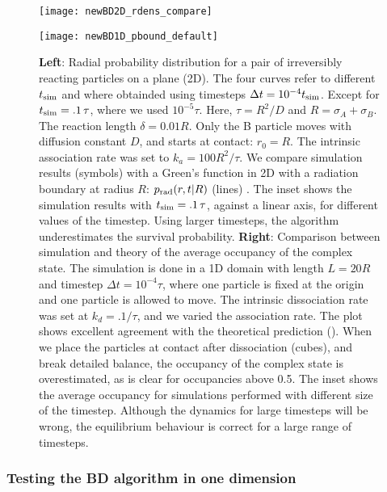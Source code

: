 \begin{figure}[ht]
\begin{minipage}[ht]{.5\linewidth}
\centering
\texttt{[image: newBD2D\_rdens\_compare]}
\end{minipage}
\begin{minipage}[ht]{.5\linewidth}
\centering
\texttt{[image: newBD1D\_pbound\_default]}
\end{minipage}
\caption{ {\bf Left}: Radial probability distribution for a pair of irreversibly reacting particles on a plane (2D). The four curves refer to different $t_{\rm sim}$ and where obtainded using timesteps  $\Delta t = 10^{-4} t_{\rm sim}$. Except for $t_{\rm sim} = .1\,\tau$, where we used $10^{-5} \tau$. Here, $\tau = R^2/D$ and $R=\sigma_A+\sigma_B$. The reaction length $\delta=0.01 R$. Only the B particle moves with diffusion constant $D$, and starts at contact: $r_0=R$. The intrinsic association rate was set to $k_a = 100 R^2/\tau$. We compare simulation results (symbols) with a Green's function in 2D with a radiation boundary at radius $R$: $p_{\rm rad}(r,t|R)$ (lines) \cite{Beck1992}. The inset shows the simulation results with $t_{\rm sim} = .1\,\tau$, against a linear axis, for different values of the timestep. Using larger timesteps, the algorithm underestimates the survival probability.
{\bf Right}: Comparison between simulation and theory of the average occupancy of the complex state. The simulation is done in a 1D domain with length $L=20 R$ and timestep $\Delta t = 10^{-4} \tau$, where one particle is fixed at the origin and one particle is allowed to move. The intrinsic dissociation rate was set at $k_d=.1/\tau$, and we varied the association rate. The plot shows excellent agreement with the theoretical prediction (). When we place the particles at contact after dissociation (cubes), and break detailed balance, the occupancy of the complex state is overestimated, as is clear for occupancies above 0.5. The inset shows the average occupancy for simulations performed with different size of the timestep. Although the dynamics for large timesteps will be wrong, the equilibrium behaviour is correct for a large range of timesteps.}
\end{figure}

\subsubsection{Testing the BD algorithm in one dimension}

